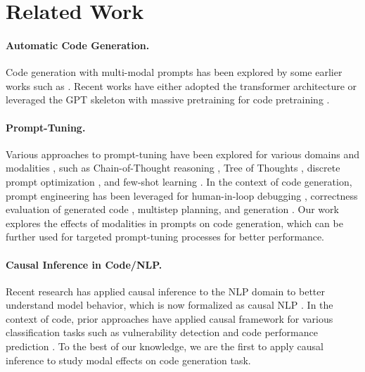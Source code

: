 \section{Related Work}
\paragraph{Automatic Code Generation.}
Code generation with multi-modal prompts has been explored by some earlier works such as \cite{desai2015program, gulwani2017program}. Recent works have either adopted the transformer architecture \cite{feng2020codebert, wang2021codet5} or leveraged the GPT \cite{brown2020language} skeleton with massive pretraining for code pretraining \cite{rozière2023code, li2023starcoder, luo2023wizardcoder, nijkamp2023codegen, zhu2024deepseek}.

\paragraph{Prompt-Tuning.} 
Various approaches to prompt-tuning \cite{white2023prompt} have been explored for various domains and modalities \cite{mullick2024intent, wu2023self}, such as Chain-of-Thought reasoning \cite{wei2023chainofthought}, Tree of Thoughts \cite{yao2023treethought}, discrete prompt optimization \cite{wen2023hard, shin2020autoprompt}, and few-shot learning \cite{brown2020language}. In the context of code generation, prompt engineering has been leveraged for human-in-loop debugging \cite{denny2022conversing}, correctness evaluation of generated code \cite{liu2023code}, multistep planning, and generation \cite{zheng2023outline}. Our work explores the effects of modalities in prompts on code generation, which can be further used for targeted prompt-tuning processes for better performance.

\paragraph{Causal Inference in Code/NLP.} 
Recent research has applied causal inference to the NLP domain \cite{vig2020investigating, finlayson2021causal, stolfo2022causal} to better understand model behavior, which is now formalized as causal NLP \cite{jin-etal-2022-causalnlp, feder2022causal}. 
In the context of code, prior approaches have applied causal framework for various classification tasks such as vulnerability detection \cite{rahman2024towards, 9793858} and code performance prediction \cite{cito2021counterfactualexplanationsmodelscode}.
To the best of our knowledge, we are the first to apply causal inference to study modal effects on code generation task.